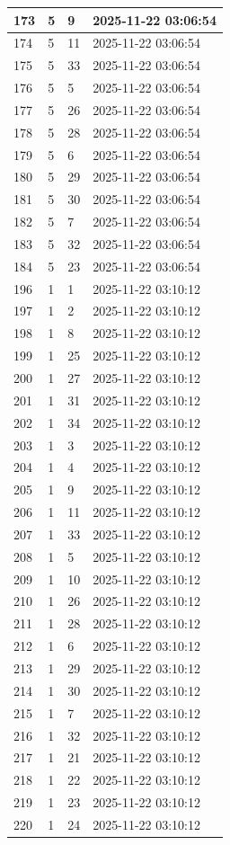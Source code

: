 \begin{longtable}{|l|l|l|l|}
173 & 5 & 9 & 2025-11-22 03:06:54 \\ \hline 
174 & 5 & 11 & 2025-11-22 03:06:54 \\ \hline 
175 & 5 & 33 & 2025-11-22 03:06:54 \\ \hline 
176 & 5 & 5 & 2025-11-22 03:06:54 \\ \hline 
177 & 5 & 26 & 2025-11-22 03:06:54 \\ \hline 
178 & 5 & 28 & 2025-11-22 03:06:54 \\ \hline 
179 & 5 & 6 & 2025-11-22 03:06:54 \\ \hline 
180 & 5 & 29 & 2025-11-22 03:06:54 \\ \hline 
181 & 5 & 30 & 2025-11-22 03:06:54 \\ \hline 
182 & 5 & 7 & 2025-11-22 03:06:54 \\ \hline 
183 & 5 & 32 & 2025-11-22 03:06:54 \\ \hline 
184 & 5 & 23 & 2025-11-22 03:06:54 \\ \hline 
196 & 1 & 1 & 2025-11-22 03:10:12 \\ \hline 
197 & 1 & 2 & 2025-11-22 03:10:12 \\ \hline 
198 & 1 & 8 & 2025-11-22 03:10:12 \\ \hline 
199 & 1 & 25 & 2025-11-22 03:10:12 \\ \hline 
200 & 1 & 27 & 2025-11-22 03:10:12 \\ \hline 
201 & 1 & 31 & 2025-11-22 03:10:12 \\ \hline 
202 & 1 & 34 & 2025-11-22 03:10:12 \\ \hline 
203 & 1 & 3 & 2025-11-22 03:10:12 \\ \hline 
204 & 1 & 4 & 2025-11-22 03:10:12 \\ \hline 
205 & 1 & 9 & 2025-11-22 03:10:12 \\ \hline 
206 & 1 & 11 & 2025-11-22 03:10:12 \\ \hline 
207 & 1 & 33 & 2025-11-22 03:10:12 \\ \hline 
208 & 1 & 5 & 2025-11-22 03:10:12 \\ \hline 
209 & 1 & 10 & 2025-11-22 03:10:12 \\ \hline 
210 & 1 & 26 & 2025-11-22 03:10:12 \\ \hline 
211 & 1 & 28 & 2025-11-22 03:10:12 \\ \hline 
212 & 1 & 6 & 2025-11-22 03:10:12 \\ \hline 
213 & 1 & 29 & 2025-11-22 03:10:12 \\ \hline 
214 & 1 & 30 & 2025-11-22 03:10:12 \\ \hline 
215 & 1 & 7 & 2025-11-22 03:10:12 \\ \hline 
216 & 1 & 32 & 2025-11-22 03:10:12 \\ \hline 
217 & 1 & 21 & 2025-11-22 03:10:12 \\ \hline 
218 & 1 & 22 & 2025-11-22 03:10:12 \\ \hline 
219 & 1 & 23 & 2025-11-22 03:10:12 \\ \hline 
220 & 1 & 24 & 2025-11-22 03:10:12 \\ \hline 
 \end{longtable}
